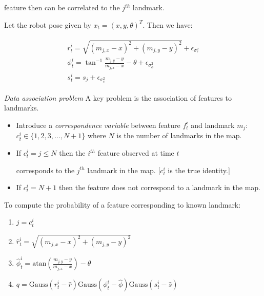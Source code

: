feature then can be correlated to the \(j^{th}\) landmark.

Let the robot pose given by \(x_t = (x, y, \theta)^T\). Then we have:

\[\begin{aligned}
\begin{array}{l} r^i_t = \sqrt{(m_{j,x}-x)^2+(m_{j,y}-y)^2} +
\epsilon_{\sigma_r^2}\\[8pt] \displaystyle \phi^i_t =
\tan^{-1}\frac{m_{j,y}-y}{m_{j,x}-x}-\theta +
\epsilon_{\sigma_{\phi}^2}\\[8pt] s^i_t = s_j + \epsilon_{\sigma_s^2}
\end{array}
\end{aligned}\]

\emph{Data association problem} A key problem is the association of
features to landmarks.

\begin{itemize}
\item
  Introduce a \emph{correspondence variable} between feature \(f_t^i\)
  and landmark \(m_j\): \(c^i_t \in \{ 1, 2, 3,
  \dots , N+1\}\) where \(N\) is the number of landmarks in the map.
\item
  If \(c^i_t = j \leq N\) then the \(i^{th}\) feature observed at time
  \(t\)

  corresponds to the \(j^{th}\) landmark in the map. {[}\(c^i_t\) is the
  true identity.{]}
\item
  If \(c^i_t = N+1\) then the feature does not correspond to a landmark
  in the map.
\end{itemize}

To compute the probability of a feature corresponding to known landmark:

\begin{enumerate}
\tightlist
\item
  \(j=c^i_t\)
\item
  \(\hat{r}^i_t = \sqrt{(m_{j,x}-x)^2+(m_{j,y}-y)^2}\)
\item
  \(\hat{\phi}^i_t =\displaystyle\mbox{atan}\left(\frac{m_{j,y}-y}{m_{j,x}-x}\right) - \theta\)
\item
  \(q = \mbox{Gauss}(r^i_t-\hat{r})\mbox{Gauss}(\phi^i_t-\hat{\phi}) \mbox{Gauss}(s^i_t-\hat{s})\)
\end{enumerate}
